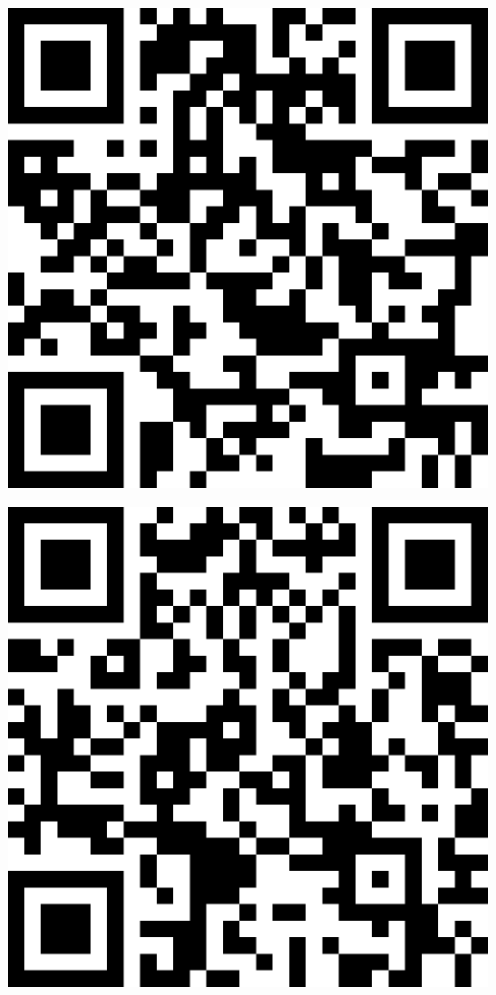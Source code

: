 \documentclass[letterpaper]{article}
\begin{document}
 \endgroup 
 \vspace*{\fill} 
 \pagebreak 
{} 
 \vspace*{\fill} 
 \begingroup 
 \centerline{\includegraphics[scale=1,width=5in,height=5in]{Office3669.png}} 
 \endgroup 
 \vspace*{\fill} 
 \pagebreak 
{} 
 \vspace*{\fill} 
 \begingroup 
 \centerline{\includegraphics[scale=1,width=5in,height=5in]{Office3671.png}} 
\end{document}
